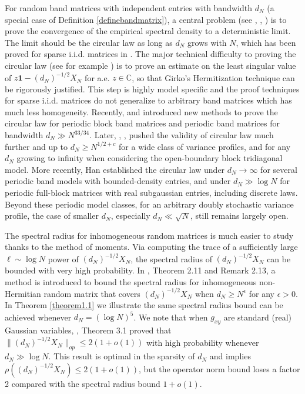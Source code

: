 \documentclass[11pt,reqno]{amsart}
\theoremstyle{plain}
\theoremstyle{remark}
\numberwithin{equation}{section}
\begin{document}
For random band matrices with independent entries with bandwidth $d_N$ (a special case of Definition \ref{definebandmatrix}), a central problem (see \cite{cook1article},  \cite{cook2article}, \cite{tikhomirov2023pseudospectrum}) is to prove the convergence of the empirical spectral density to a deterministic limit. The limit should be the circular law as long as $d_N$ grows with $N$, which has been proved for sparse i.i.d. matrices in \cite{rudelson2019sparse}. The major technical difficulty to proving the circular law (see for example \cite{ WOS:000281425000010}) is to prove an estimate on the least singular value of $z\mathbf{1}-(d_N)^{-1/2}X_N$ for a.e. $z\in\mathbb{C}$, so that Girko's Hermitization technique \cite{girko2article} \cite{girkoarticle} can be rigorously justified. This step is highly model specific and the proof techniques for sparse i.i.d. matrices \cite{rudelson2019sparse} do not generalize to arbitrary band matrices which has much less homogeneity. Recently, \cite{jain2021circular} and \cite{tikhomirov2023pseudospectrum} introduced new methods to prove the circular law for periodic block band matrices and periodic band matrices for bandwidth $d_N\gg N^{33/34}$. Later, \cite{han2024circular}, \cite{han2025circular}, \cite{han2025circular2} pushed the validity of circular law much further and up to $d_N\geq N^{1/2+c}$ for a wide class of variance profiles, and for any $d_N$ growing to infinity when considering the open-boundary block tridiagonal model. More recently, Han \cite{han2026circular} established the circular law under $d_N\to\infty$ for several periodic band models with bounded-density entries, and under $d_N\gg\log N$ for periodic full-block matrices with real subgaussian entries, including discrete laws. Beyond these periodic model classes, for an arbitrary doubly stochastic variance profile, the case of smaller $d_N$, especially $d_N\ll\sqrt{N}$, still remains largely open.

The spectral radius for inhomogeneous random matrices is much easier to study thanks to the method of moments. Via computing the trace of a sufficiently large $\ell\sim\log N$ power of $(d_N)^{-1/2}X_N$, the spectral radius of $(d_N)^{-1/2}X_N$ can be bounded with very high probability. In \cite{benaych2020spectral}, Theorem 2.11 and Remark 2.13, a method is introduced to bound the spectral radius for inhomogeneous non-Hermitian random matrix that covers $(d_N)^{-1/2}X_N$ when $d_N\geq N^\epsilon$ for any $\epsilon>0$. In Theorem \ref{theorem1.1} we illustrate the same spectral radius bound can be achieved whenever $d_N=(\log N)^5$. We note that when $g_{xy}$ are standard (real) Gaussian variables, \cite{bandeira2016sharp}, Theorem 3.1 proved that $\|(d_N)^{-1/2}X_N\|_{op}\leq 2(1+o(1))$ with high probability whenever $d_N\gg\log N$. This result is optimal in the sparsity of $d_N$ and implies $\rho((d_N)^{-1/2}X_N)\leq2(1+o(1))$, but the operator norm bound loses a factor 2 compared with the spectral radius bound $1+o(1)$.
\end{document}
